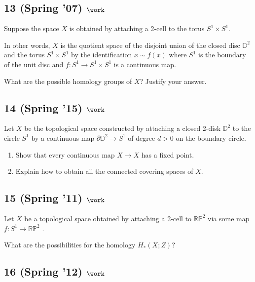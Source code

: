 \hypertarget{spring-07-work-1}{%
\subsection{\texorpdfstring{13 (Spring '07)
\(\work\)}{13 (Spring '07) \textbackslash work}}\label{spring-07-work-1}}

Suppose the space \(X\) is obtained by attaching a 2-cell to the torus
\(S^1 \times S^1\).

In other words, \(X\) is the quotient space of the disjoint union of the
closed disc \({\mathbb{D}}^2\) and the torus \(S^1 \times S^1\) by the
identification \(x \sim f(x)\) where \(S^1\) is the boundary of the unit
disc and \(f : S^1 \to S^1 \times S^1\) is a continuous map.

What are the possible homology groups of \(X\)? Justify your answer.

\hypertarget{spring-15-work-3}{%
\subsection{\texorpdfstring{14 (Spring '15)
\(\work\)}{14 (Spring '15) \textbackslash work}}\label{spring-15-work-3}}

Let \(X\) be the topological space constructed by attaching a closed
2-disk \({\mathbb{D}}^2\) to the circle \(S^1\) by a continuous map
\(\partial{\mathbb{D}}^2 \to S^1\) of degree \(d > 0\) on the boundary
circle.

\begin{enumerate}
\def\labelenumi{\alph{enumi}.}
\item
  Show that every continuous map \(X \to X\) has a fixed point.
\item
  Explain how to obtain all the connected covering spaces of \(X\).
\end{enumerate}

\hypertarget{spring-11-work-2}{%
\subsection{\texorpdfstring{15 (Spring '11)
\(\work\)}{15 (Spring '11) \textbackslash work}}\label{spring-11-work-2}}

Let \(X\) be a topological space obtained by attaching a 2-cell to
\({\mathbb{RP}}^2\) via some map \(f: S^1 \to {\mathbb{RP}}^2\) .

What are the possibilities for the homology \(H_* (X; Z)\)?

\hypertarget{spring-12-work-1}{%
\subsection{\texorpdfstring{16 (Spring '12)
\(\work\)}{16 (Spring '12) \textbackslash work}}\label{spring-12-work-1}}

